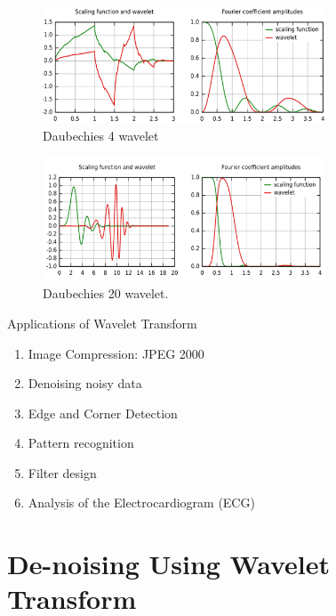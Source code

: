 \documentclass[12pt, a4paper, twoside]{report}
\begin{document}
\begin{figure}[!h]
	\centering
	\includegraphics[width=0.75\textwidth]
	{images/chapter3/daubechies-4}
	\caption{Daubechies 4 wavelet}
	\label{fig:daubechies-4}
\end{figure}
\begin{figure}[!h]
	\centering
	\includegraphics[width=0.75\textwidth]
	{images/chapter3/daubechies-20}
	\caption{Daubechies 20 wavelet.}
	\label{fig:daubechies-20}
\end{figure}

Applications of Wavelet Transform
\begin{enumerate}
\item Image Compression: JPEG 2000
\item Denoising noisy data
\item Edge and Corner Detection
\item Pattern recognition
\item Filter design
\item Analysis of the Electrocardiogram (ECG)
\end{enumerate}

\section{De-noising Using Wavelet Transform}
\end{document}

